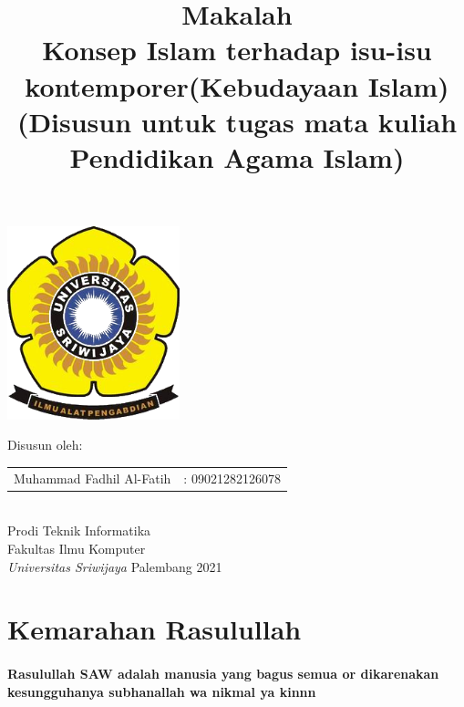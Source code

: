 \documentclass[a4paper,12 pt]{article}
\title{\textbf{Makalah}\linebreak \\ \textbf{Konsep Islam terhadap isu-isu kontemporer(Kebudayaan Islam)}\\[1\baselineskip] \normalsize{\textbf{(Disusun untuk tugas mata kuliah Pendidikan Agama Islam)}}}
\date{}
\author{}
\begin{document}
\maketitle
\begin{center}
\includegraphics[width=5cm]{unsri.png}
\end{center}
\vspace{1 cm}

\begin{center}
Disusun oleh:\\[1\baselineskip]
\begin{tabular}{ll} %
Muhammad Fadhil Al-Fatih &: 09021282126078\\ 
\end{tabular}\\[2\baselineskip]

Prodi Teknik Informatika\\
Fakultas Ilmu Komputer\\ 
\textit{Universitas Sriwijaya}
\linebreak 
Palembang 2021 \linebreak 
\end{center}


\section{Kemarahan Rasulullah}
\paragraph{Rasulullah SAW adalah manusia yang bagus semua or
           dikarenakan kesungguhanya subhanallah wa nikmal ya kinnn}
\end{document}
